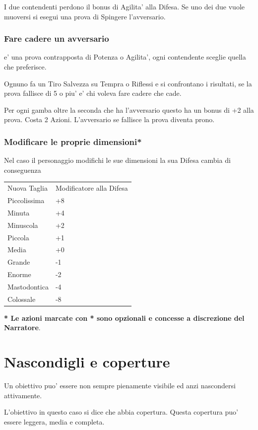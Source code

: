 \documentclass[a4paper,11pt,twoside,openany]{dndbook}
\begin{document}
I due contendenti perdono il bonus di Agilita' alla Difesa. Se uno dei due vuole muoversi si esegui una prova di Spingere l'avversario.

\subsubsection{Fare cadere un avversario} e' una prova contrapposta di Potenza o Agilita', ogni contendente sceglie quella che preferisce. 

Ognuno fa un Tiro Salvezza su Tempra o Riflessi e si confrontano i risultati, se la prova fallisce di 5 o piu' e' chi voleva fare cadere che cade.

Per ogni gamba oltre la seconda che ha l'avversario questo ha un bonus di +2 alla prova. Costa 2 Azioni. L'avversario se fallisce la prova diventa prono.

\subsubsection{Modificare le proprie dimensioni*}

Nel caso il personaggio modifichi le sue dimensioni la sua Difesa cambia di conseguenza

\bigskip

\begin{tabular}[c]{@{}ll@{}}
\toprule 
Nuova Taglia & Modificatore alla Difesa\tabularnewline
Piccolissima & +8\tabularnewline
Minuta & +4\tabularnewline
Minuscola & +2\tabularnewline
Piccola & +1\tabularnewline
Media & +0\tabularnewline
Grande & -1\tabularnewline
Enorme & -2\tabularnewline
Mastodontica & -4\tabularnewline
Colossale & -8\tabularnewline
\bottomrule
\end{tabular}

\bigskip

\textbf{{*} Le azioni marcate con {*} sono opzionali e concesse a
discrezione del Narratore}.

\pagebreak

\section{Nascondigli e coperture}

\label{nascondigli-e-coperture}
Un obiettivo puo' essere non sempre pienamente visibile ed anzi nascondersi
attivamente.

L'obiettivo in questo caso si dice che abbia copertura. Questa copertura puo' essere leggera, media e completa.
\end{document}
